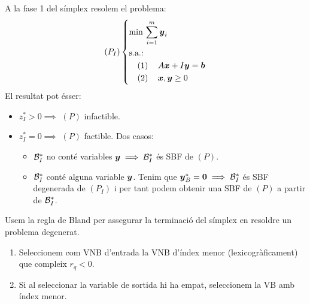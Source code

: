 \begin{obs}
    A la fase 1 del símplex resolem el problema:
    \begin{equation*}
        \lp P_I \rp \begin{dcases*}
            \min\, \sum_{i = 1}^m \vb{y}_i \\
            \text{s.a.: } \\
            \quad \left( 1 \right) \quad A\vb{x} + I\vb{y} = \vb{b} \\
            \quad \left( 2 \right) \quad \vb{x}, \vb{y} \geq 0 \\
        \end{dcases*}
    \end{equation*}
    El resultat pot ésser:
    \begin{itemize}
        \item $z_I^* > 0 \implies$ $\left(P\right)$ infactible.
        \item $z_I^* = 0 \implies$ $\left(P\right)$ factible. Dos casos:
            \begin{itemize}
                \item $\mathcal{B}_I^*$ no conté variables $\boldsymbol{y} \implies \mathcal{B}_I^*$ és SBF de $\left(P\right)$.
                \item $\mathcal{B}_I^*$ conté alguna variable $\boldsymbol{y}$. Tenim que $\boldsymbol{y}_B^* = \boldsymbol{0} \implies \mathcal{B}_I^*$ és SBF degenerada de $\left(P_I\right)$ i per tant podem obtenir una SBF de $\left(P\right)$ a partir de $\mathcal{B}_I^*$.
            \end{itemize}
    \end{itemize}
\end{obs}
\begin{rgl}[de Bland] \label{rgl:bland}
    Usem la regla de Bland per assegurar la terminació del símplex en resoldre 
    un problema degenerat.
    \begin{enumerate}
        \item Seleccionem com VNB d'entrada la VNB d'índex menor 
        (lexicogràficament) que compleix $r_q < 0$.
        \item Si al seleccionar la variable de sortida hi ha empat, seleccionem la VB amb índex menor.
    \end{enumerate}
\end{rgl}
